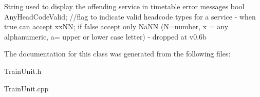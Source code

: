String used to display the offending service in timetable error messages bool Any\+Head\+Code\+Valid; //flag to indicate valid headcode types for a service -\/ when true can accept xx\+NN; if false accept only Na\+NN (N=number, x = any alphanumeric, a= upper or lower case letter) -\/ dropped at v0.\+6b 

The documentation for this class was generated from the following files\+:\begin{DoxyCompactItemize}
\item 
Train\+Unit.\+h\item 
Train\+Unit.\+cpp\end{DoxyCompactItemize}
